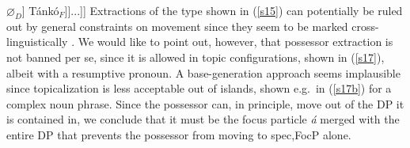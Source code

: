 \documentclass[output=paper,
modfonts
]{langscibook}
\begin{document}
\ea \relax[$_{FocP}$ \tikzmark{f2}\hspace{2mm}\tikzmark{f} [$_{Foc}$ c\'i] [$_{TP}$ ... [$_{F\tikzmark{t}P}$ \'a [$_{DP}$ [$_{D'}$ [$_{NP}$ nd\'ur] $\varnothing_D$] Tánkó$_F$]]...]]
     \label{s16}
\z
\vspace{6mm}
Extractions of the type shown in (\ref{s15}) can potentially be ruled out by general constraints on movement since they seem to be marked cross-linguistically \citep{Corver1990,Boscovic2005}. We would like to point out, however, that possessor extraction is not banned per se, since it is allowed in topic configurations, shown in (\ref{s17}), albeit with a resumptive pronoun. A base-generation approach seems implausible since topicalization is less acceptable out of islands, shown e.g.\ in (\ref{s17b}) for a complex noun phrase.
\ea
{}
\z \z
Since the possessor can, in principle, move out of the DP it is contained in, we conclude that it must be the focus particle {\em \'a} merged with the entire DP that prevents the possessor from moving to spec,FocP alone.
\end{document}
